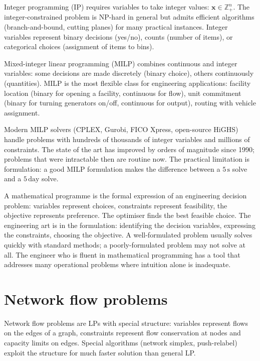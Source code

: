 Integer programming (IP) requires variables to take integer values: $\mathbf{x} \in \mathbb{Z}_+^n$. The integer-constrained problem is NP-hard in general but admits efficient algorithms (branch-and-bound, cutting planes) for many practical instances. Integer variables represent binary decisions (yes/no), counts (number of items), or categorical choices (assignment of items to bins).

Mixed-integer linear programming (MILP) combines continuous and integer variables: some decisions are made discretely (binary choice), others continuously (quantities). MILP is the most flexible class for engineering applications: facility location (binary for opening a facility, continuous for flow), unit commitment (binary for turning generators on/off, continuous for output), routing with vehicle assignment.

Modern MILP solvers (CPLEX, Gurobi, FICO Xpress, open-source HiGHS) handle problems with hundreds of thousands of integer variables and millions of constraints. The state of the art has improved by orders of magnitude since 1990; problems that were intractable then are routine now. The practical limitation is formulation: a good MILP formulation makes the difference between a $5\,\text{s}$ solve and a $5\,\text{day}$ solve.

\begin{archetype}
A mathematical programme is the formal expression of an engineering decision problem: variables represent choices, constraints represent feasibility, the objective represents preference. The optimiser finds the best feasible choice. The engineering art is in the formulation: identifying the decision variables, expressing the constraints, choosing the objective. A well-formulated problem usually solves quickly with standard methods; a poorly-formulated problem may not solve at all. The engineer who is fluent in mathematical programming has a tool that addresses many operational problems where intuition alone is inadequate.
\end{archetype}

\section{Network flow problems}

Network flow problems are LPs with special structure: variables represent flows on the edges of a graph, constraints represent flow conservation at nodes and capacity limits on edges. Special algorithms (network simplex, push-relabel) exploit the structure for much faster solution than general LP.

